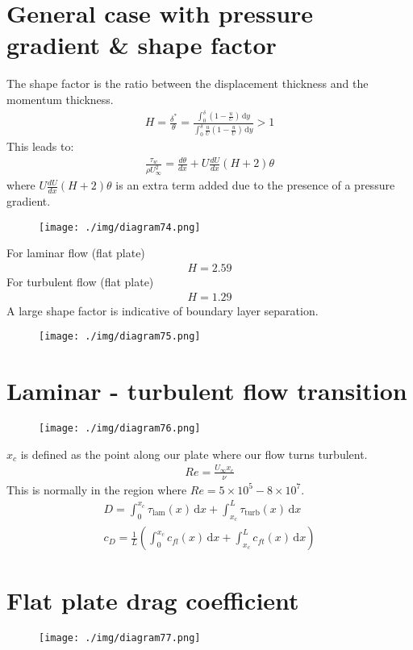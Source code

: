 \section{General case with pressure gradient \& shape factor}
The shape factor is the ratio between the displacement thickness and the momentum thickness.
\begin{align}
  H = \frac{\delta^*}{\theta} = \frac{\int_{0}^{\delta} \left(1 - \frac{u}{U}\right) \,\mathrm{d}y}{\int_{0}^{\delta} \frac{u}{U} \left(1 - \frac{u}{U}\right) \,\mathrm{d}y} > 1
\end{align}
This leads to:
\begin{align}
  \frac{\tau_w}{\rho U_\infty^2} = \frac{d\theta}{dx} + U \frac{dU}{dx} (H + 2)\theta
\end{align}
where $U \frac{dU}{dx} (H + 2)\theta$ is an extra term added due to the presence of a pressure gradient.
\begin{figure}[H]
  \centering
  \texttt{[image: ./img/diagram74.png]}
\end{figure}
For laminar flow (flat plate)
\begin{align}
  H = 2.59
\end{align}
For turbulent flow (flat plate)
\begin{align}
  H = 1.29
\end{align}
A large shape factor is indicative of boundary layer separation.
\begin{figure}[H]
  \centering
  \texttt{[image: ./img/diagram75.png]}
\end{figure}
\section{Laminar - turbulent flow transition}
\begin{figure}[H]
  \centering
  \texttt{[image: ./img/diagram76.png]}
\end{figure}
$x_c$ is defined as the point along our plate where our flow turns turbulent.
\begin{gather}
  Re = \frac{U_\infty x_c}{\nu}
\end{gather}
This is normally in the region where $Re = 5 \times 10^5 - 8\times 10^7$.
\begin{align}
  D = \int_{0}^{x_c} \tau_{\textrm{lam}} (x) \,\mathrm{d}x + \int_{x_c}^{L} \tau_{\textrm{turb}} (x) \,\mathrm{d}x \\
  c_D = \frac{1}{L} \left( \int_{0}^{x_c} c_{fl} (x) \,\mathrm{d}x + \int_{x_c}^{L} c_{ft} (x) \,\mathrm{d}x  \right)
\end{align}
\section{Flat plate drag coefficient}
\begin{figure}[H]
  \centering
  \texttt{[image: ./img/diagram77.png]}
\end{figure}